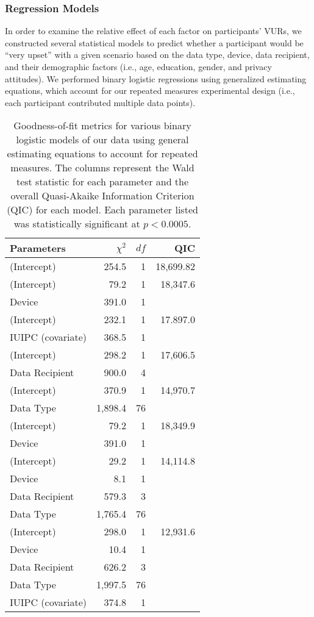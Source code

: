 \subsubsection{Regression Models} 
\label{sec:regression}
In order to examine the relative effect of each factor on participants' VURs, we constructed several statistical models to predict whether a participant would be ``very upset'' with a given scenario based on the data type, device, data recipient, and their demographic factors (i.e., age, education, gender, and privacy attitudes). We performed binary logistic regressions using generalized estimating equations, which account for our repeated measures experimental design (i.e., each participant contributed multiple data points).

\begin{table}[t]
\centering
\begin{tabular}{|l| r| r| r|}
\hline
Parameters & $\chi^2$ & $df$ & QIC\\
\hline
\hline
(Intercept) & 254.5 & 1 & 18,699.82\\
\hline
(Intercept) & 79.2 & 1 & 18,347.6\\
Device & 391.0 & 1 & \\
\hline
(Intercept) & 232.1 & 1 & 17.897.0\\
IUIPC (covariate) & 368.5 & 1 & \\
\hline
(Intercept) & 298.2 & 1 &17,606.5\\
Data Recipient & 900.0 & 4 & \\
\hline
(Intercept) & 370.9 & 1 & 14,970.7\\
Data Type & 1,898.4& 76 & \\
\hline
(Intercept) & 79.2 & 1 & 18,349.9\\
Device & 391.0 & 1 & \\
\hline
(Intercept) & 29.2 & 1 & 14,114.8\\
Device & 8.1 & 1 &  \\
Data Recipient & 579.3 & 3 & \\
Data Type & 1,765.4 & 76 &  \\
\hline
(Intercept) & 298.0 & 1 & 12,931.6 \\
Device  & 10.4 & 1 &  \\
Data Recipient & 626.2 & 3 & \\
Data Type & 1,997.5 & 76 & \\
IUIPC (covariate) & 374.8 & 1 & \\
\hline
\end{tabular}
\caption{Goodness-of-fit metrics for various binary logistic models of our data using general estimating equations to account for repeated measures. The columns represent the Wald test statistic for each parameter and the overall Quasi-Akaike Information Criterion (QIC) for each model. Each parameter listed was statistically significant at $p<0.0005$.}
\label{regression}
\end{table}

